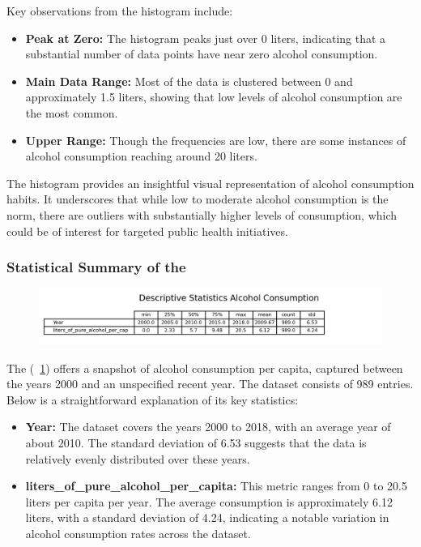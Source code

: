             Key observations from the histogram include:

            \begin{itemize}
                \item \textbf{Peak at Zero:} The histogram peaks just over 0 liters, indicating that a substantial number of data points have near zero alcohol consumption.

                \item \textbf{Main Data Range:} Most of the data is clustered between 0 and approximately 1.5 liters, showing that low levels of alcohol consumption are the most common.

                \item \textbf{Upper Range:} Though the frequencies are low, there are some instances of alcohol consumption reaching around 20 liters.
            \end{itemize}

            The histogram provides an insightful visual representation of alcohol consumption habits. It underscores that while low to moderate alcohol consumption is the norm, there are outliers with substantially higher levels of consumption, which could be of interest for targeted public health initiatives.

            \subsubsection{Statistical Summary of the \dsAlcohol}
                \begin{figure}[H]
                        \centering
                        \includegraphics[scale=1]{images/du_alcohol_summary}
                        \caption{}
                        \label{fig:du-alcohol-summary}
                \end{figure}


                The \textit{\dsAlcohol} (\figurename~\ref{fig:du-alcohol-summary}) offers a snapshot of alcohol consumption per capita, captured between the years 2000 and an unspecified recent year. The dataset consists of 989 entries. Below is a straightforward explanation of its key statistics:

                \begin{itemize}
                        \item \textbf{Year:} The dataset covers the years 2000 to 2018, with an average year of about 2010. The standard deviation of 6.53 suggests that the data is relatively evenly distributed over these years.

                        \item \textbf{liters\_of\_pure\_alcohol\_per\_capita:} This metric ranges from 0 to 20.5 liters per capita per year. The average consumption is approximately 6.12 liters, with a standard deviation of 4.24, indicating a notable variation in alcohol consumption rates across the dataset.
                \end{itemize}

